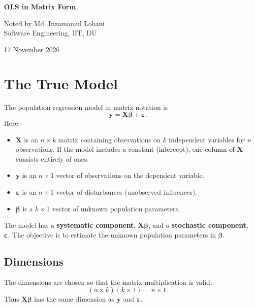 \documentclass[11pt]{article}
\newcommand{\eps}{\boldsymbol{\varepsilon}}
\newcommand{\XX}{\mathbf{X}}
\newcommand{\yy}{\mathbf{y}}
\begin{document}
\begin{titlepage}
    \centering
    \vspace*{\fill}
    {\Huge\bfseries OLS in Matrix Form\par}
    \vspace{1.5em}
    {\Large Noted by Md. Inzamamul Lohani\\
Software Engineering, IIT, DU\par}
    \vspace{2em}
    {\large 17 November 2026\par}
    \vspace*{\fill}
\end{titlepage}
\setcounter{page}{2}

\tableofcontents
\newpage

\section{The True Model}

The population regression model in matrix notation is
\begin{equation}
    \boxed{\yy=\XX\boldsymbol{\beta}+\eps.}
    \label{eq:true-model}
\end{equation}
Here:
\begin{itemize}
    \item $\XX$ is an $n\times k$ matrix containing observations on $k$ independent variables for $n$ observations. If the model includes a constant (intercept), one column of $\XX$ consists entirely of ones.
    \item $\yy$ is an $n\times 1$ vector of observations on the dependent variable.
    \item $\eps$ is an $n\times 1$ vector of disturbances (unobserved influences).
    \item $\boldsymbol{\beta}$ is a $k\times 1$ vector of unknown population parameters.
\end{itemize}
The model has a \textbf{systematic component}, $\XX\boldsymbol{\beta}$, and a \textbf{stochastic component}, $\eps$. The objective is to estimate the unknown population parameters in $\boldsymbol{\beta}$.

\subsection{Dimensions}
The dimensions are chosen so that the matrix multiplication is valid:
\[
(n\times k)(k\times 1)=n\times 1.
\]
Thus $\XX\boldsymbol{\beta}$ has the same dimension as $\yy$ and $\eps$.
\end{document}
